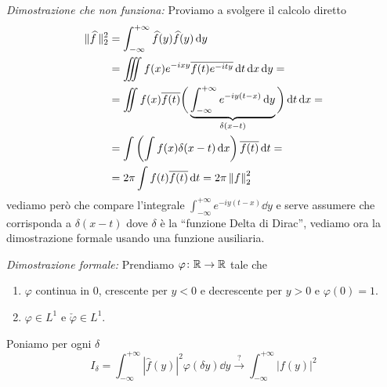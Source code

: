 \textit{Dimostrazione che non funziona:}
Proviamo a svolgere il calcolo diretto
$$
\begin{aligned}
	\|\widehat f\,\|_2^2 
	&= \int_{-\infty}^{+\infty} \widehat f(y) \widehat f(y) \,\mathrm{d} y \\
	&= \iiint f(x) e^{-ixy} \overline{f(t) e^{-ity}} \,\mathrm{d} t \,\mathrm{d} x \,\mathrm{d} y = \\
	&= \iint f(x) \overline{f(t)} \bigg( \underbrace{\int_{-\infty}^{+\infty} e^{-iy(t-x)} \,\mathrm{d} y}_{\delta(x-t)} \bigg) \,\mathrm{d} t \,\mathrm{d} x = \\
	&= \int \left( \int f(x) \delta(x - t) \,\mathrm{d} x \right) \overline{f(t)} \,\mathrm{d} t = \\
	&= 2\pi \int f(t) \overline{f(t)} \,\mathrm{d} t = 2\pi \left\lVert f \right\rVert_2^2
\end{aligned}
$$
vediamo però che compare l'integrale $\int_{-\infty}^{+\infty} e^{-iy(t-x)} \dd y$ e serve assumere che corrisponda a $\delta(x - t)$ dove $\delta$ è la ``funzione Delta di Dirac'', vediamo ora la dimostrazione formale usando una funzione ausiliaria.

\textit{Dimostrazione formale:}
Prendiamo $\varphi \colon \mathbb R \to \mathbb R$ tale che
\begin{enumerate}
	\item $\varphi$ continua in $0$, crescente per $y < 0$ e decrescente per $y > 0$ e $\varphi(0) = 1$.
	\item $\varphi \in L^1$ e $\check\varphi \in L^1$.
\end{enumerate}

Poniamo per ogni $\delta$
$$
I_\delta = \int_{-\infty}^{+\infty} |\hat f(y)|^2 \varphi(\delta y) \dd y
\xrightarrow{\text{?}}
\int_{-\infty}^{+\infty} |f(y)|^2
$$

